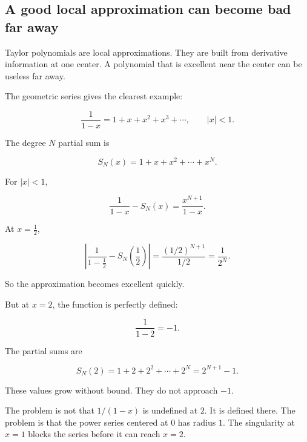 \subsection{A good local approximation can become bad far away}
\label{subsec:local-approximation-bad-far-away}

Taylor polynomials are local approximations.  They are built from derivative information
at one center.  A polynomial that is excellent near the center can be useless far away.

The geometric series gives the clearest example:

\[
\frac1{1-x}=1+x+x^2+x^3+\cdots,
\qquad |x|<1.
\]

The degree \(N\) partial sum is

\[
S_N(x)=1+x+x^2+\cdots+x^N.
\]

For \(|x|<1\),

\[
\frac1{1-x}-S_N(x)
=
\frac{x^{N+1}}{1-x}.
\]

At \(x=\frac12\),

\[
\left|
\frac1{1-\frac12}-S_N\left(\frac12\right)
\right|
=
\frac{(1/2)^{N+1}}{1/2}
=
\frac1{2^N}.
\]

So the approximation becomes excellent quickly.

But at \(x=2\), the function is perfectly defined:

\[
\frac1{1-2}=-1.
\]

The partial sums are

\[
S_N(2)=1+2+2^2+\cdots+2^N=2^{N+1}-1.
\]

These values grow without bound.  They do not approach \(-1\).

The problem is not that \(1/(1-x)\) is undefined at \(2\).  It is defined there.  The
problem is that the power series centered at \(0\) has radius \(1\).  The singularity at
\(x=1\) blocks the series before it can reach \(x=2\).

